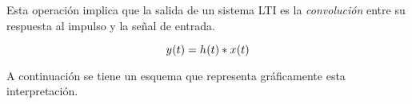 Esta operación implica que la salida de un sistema LTI es la \emph{convolución} entre su respuesta al impulso y la señal de entrada.

\begin{mdframed}[style=PropertyFrame]
    \begin{prop}
    \end{prop}
    \begin{equation*}
        \fx[y]{t} = \fx[h]{t} * \fx[x]{t}
    \end{equation*}
\end{mdframed}

A continuación se tiene un esquema que representa gráficamente esta interpretación.

\begin{center}
    \def\svgwidth{0.8\linewidth}
    
\end{center}